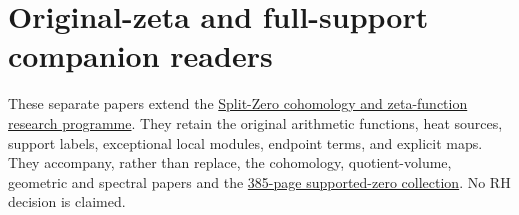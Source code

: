 \documentclass[
]{article}
\author{}
\date{}
\begin{document}
\section{Original-zeta and full-support companion
readers}\label{original-zeta-and-full-support-companion-readers}

These separate papers extend the
\href{https://github.com/KokunoYumeto/zeta-function-research-reader}{Split-Zero
cohomology and zeta-function research programme}. They retain the
original arithmetic functions, heat sources, support labels, exceptional
local modules, endpoint terms, and explicit maps. They accompany, rather
than replace, the cohomology, quotient-volume, geometric and spectral
papers and the
\href{https://github.com/KokunoYumeto/zeta-function-research-reader/blob/main/workbenches/splitzero-tandem/branches/tau-zero-prime-positivity/TAU_ZERO_PRIME_POSITIVITY.pdf}{385-page
supported-zero collection}. No RH decision is claimed.
\end{document}
